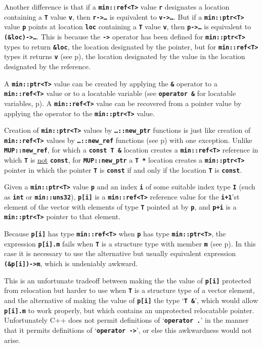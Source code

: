 \documentclass[12pt]{article}
\newcommand{\TT}[1]{{\tt \bfseries #1}}
\newcommand{\pagref}[1]{p\pageref{#1}}
\newcommand{\EOL}{\penalty \exhyphenpenalty}
\begin{document}
Another difference is that if a \TT{min::\EOL ref<T>} value \TT{r}
designates a location containing a \TT{T} value \TT{v}, then
\TT{r->\ldots}\label{PTR->} is equivalent to \TT{v->\ldots}.
But if a \TT{min::\EOL ptr<T>} value \TT{p}
points at location \TT{loc} containing a \TT{T} value \TT{v}, then
\TT{p->\ldots} is equivalent to \TT{(\&loc)->\ldots}.
This is because
the \TT{->} operator has been defined for \TT{min::\EOL ptr<T>}
types to return \TT{\&loc}, the location designated by the pointer,
but for \TT{min::\EOL ref<T>} types
it returns \TT{v} (see \pagref{REF->}), the location designated by
the value in the location designated by the reference.

A \TT{min::\EOL ptr<T>} value can be created by applying the
\TT{\&} operator to a \TT{min::\EOL ref<T>} value or to a
locatable variable (see \TT{operator \&} for locatable variables,
\pagref{LOCATABLE_VAR_PTR}).
A \TT{min::\EOL ref<T>} value can be recovered from a
pointer value by applying the
\TT{*} operator to the \TT{min::\EOL ptr<T>} value.

Creation of \TT{min::\EOL ptr<T>} values by \TT{\ldots::new\_\EOL ptr}
functions is just like
creation of \TT{min::\EOL ref<T>} values by \TT{\ldots::new\_\EOL ref}
functions (see \pagref{NEW_REF_USAGE}) with one exception.
Unlike \TT{MUP::\EOL new\_\EOL ref}, for which a \TT{const~T~\&}
location creates a \TT{min::\EOL ref<T>} reference in which \TT{T}
is \underline{not} \TT{const},
for \TT{MUP::\EOL new\_\EOL ptr}
a \TT{T~*} location creates a \TT{min::\EOL ptr<T>} pointer in which
the pointer \TT{T} is \TT{const} if and only if the location \TT{T}
is \TT{const}.

Given a \TT{min::\EOL ptr<T>} value \TT{p} and an index \TT{i} of some
suitable index type \TT{I} (such as \TT{int} or \TT{min::\EOL uns32}),
\TT{p[i]} is a \TT{min::\EOL ref<T>}
reference value for the \TT{i+1}'st element of
the vector with elements of type \TT{T} pointed at by \TT{p}, and
\TT{p+i} is a \TT{min::\EOL ptr<T>} pointer to that element.

Because \TT{p[i]} has type \TT{min::\EOL ref<T>} when \TT{p} has
type \TT{min::\EOL ptr<T>}, the expression \TT{p[i].m} fails when
\TT{T} is a structure type with member \TT{m} (see \pagref{REF->}).
In this case it is
necessary to use the alternative but usually equivalent expression
\TT{(\&p[i])->m}, which is undeniably awkward.

This is an unfortunate tradeoff between making the
the value of \TT{p[i]} protected from relocation
but harder to use when \TT{T} is a structure type of a vector element,
and the alternative of making the value of \TT{p[i]}
the type `\TT{T \&}', which would allow \TT{p[i].m}
to work properly, but which contains an unprotected relocatable pointer.
Unfortunately C++ does not permit definitions of `\TT{operator .}' in
the manner that it permits definitions of `\TT{operator ->}', or else
this awkwardness would not arise.
\end{document}
